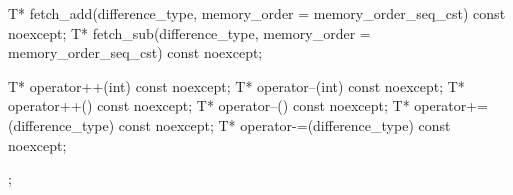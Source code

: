 \begin{codeblock}
{{    T* fetch_add(difference_type, memory_order = memory_order_seq_cst) const noexcept;
    T* fetch_sub(difference_type, memory_order = memory_order_seq_cst) const noexcept;

    T* operator++(int) const noexcept;
    T* operator--(int) const noexcept;
    T* operator++() const noexcept;
    T* operator--() const noexcept;
    T* operator+=(difference_type) const noexcept;
    T* operator-=(difference_type) const noexcept;
  };
}
\end{codeblock}

